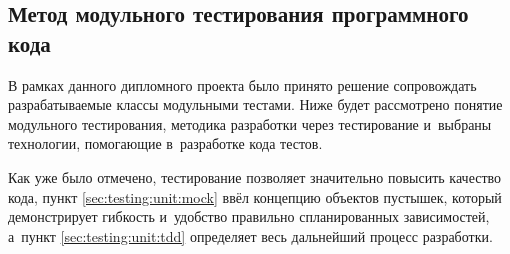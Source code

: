 \subsection{Метод модульного тестирования программного кода}
\label{sec:testing:unit}

В рамках данного дипломного проекта было принято решение сопровождать разрабатываемые классы модульными тестами. Ниже будет рассмотрено понятие модульного тестирования, методика разработки через тестирование и~выбраны технологии, помогающие в~разработке кода тестов.





Как уже было отмечено, тестирование позволяет значительно повысить качество кода, пункт \ref{sec:testing:unit:mock} ввёл концепцию объектов пустышек, который демонстрирует гибкость и~удобство правильно спланированных зависимостей, а~пункт \ref{sec:testing:unit:tdd} определяет весь дальнейший процесс разработки.